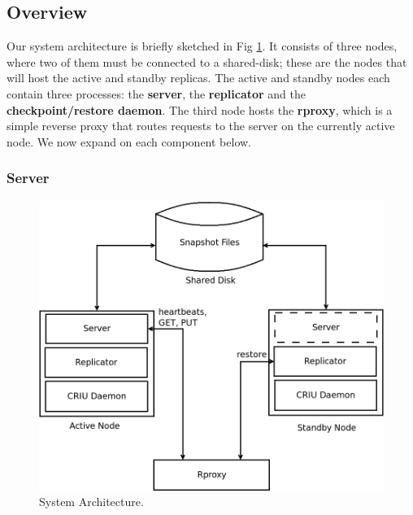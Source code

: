 \documentclass[final]{proc}
\begin{document}
\subsection{Overview}

Our system architecture is briefly sketched in Fig \ref{fig:arch}. It consists
of three nodes, where two of them must be connected to a shared-disk; these are
the nodes that will host the active and standby replicas. The active and standby
nodes each contain three processes: the \textbf{server}, the \textbf{replicator}
and the \textbf{checkpoint/restore daemon}. The third node hosts the
\textbf{rproxy}, which is a simple reverse proxy that routes requests to the
server on the currently active node. We now expand on each component below.

\subsubsection{Server}

\begin{figure}
  \includegraphics[width=\columnwidth]{arch}
  \caption{System Architecture.}
  \label{fig:arch}
\end{figure}
\end{document}
